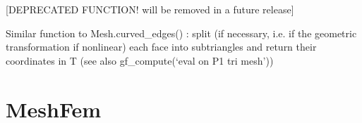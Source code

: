 \documentclass[a4paper,11pt,english]{sphinxmanual}
\begin{document}
\begin{fulllineitems}

\begin{fulllineitems}
\label{\detokenize{python/cmdref_Mesh:getfem.Mesh.triangulated_surface}}
{[}DEPRECATED FUNCTION! will be removed in a future release{]}

Similar function to Mesh.curved\_edges() : split (if
necessary, i.e. if the geometric transformation if non\sphinxhyphen{}linear)
each face into sub\sphinxhyphen{}triangles and return their coordinates in T
(see also gf\_compute(‘eval on P1 tri mesh’))

\end{fulllineitems}


\end{fulllineitems}



\section{MeshFem}
\label{\detokenize{python/cmdref_MeshFem:meshfem}}\label{\detokenize{python/cmdref_MeshFem::doc}}
\end{document}
